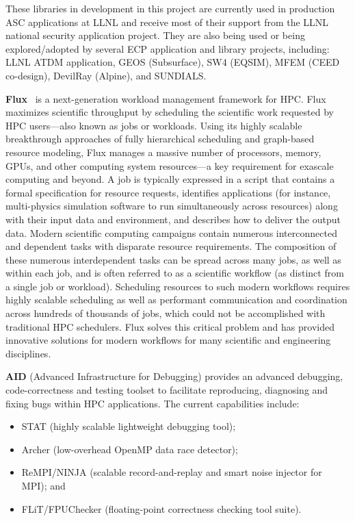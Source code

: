 These libraries in development in this project are currently used in
production ASC applications at
LLNL and receive most of their support from the LLNL national security
application project. They are also being used or being explored/adopted
by several ECP application and library projects, including: LLNL ATDM
application, GEOS (Subsurface), SW4 (EQSIM), MFEM (CEED co-design),
DevilRay (Alpine), and SUNDIALS.

\textbf{Flux}~\cite{flux,flux-fgcs:2020} is a next-generation workload management
framework for HPC. Flux maximizes scientific throughput
by scheduling the scientific work requested by HPC users--–also
known as jobs or workloads.  Using its highly scalable
breakthrough approaches of fully hierarchical scheduling and
graph-based resource modeling, Flux manages a massive number
of processors, memory, GPUs, and other computing system
resources--–a key requirement for exascale computing and beyond.
A job is typically expressed in a script that contains
a formal specification for resource requests, identifies
applications (for instance, multi-physics simulation software
to run simultaneously across resources) along with their
input data and environment, and describes how to deliver
the output data. Modern scientific computing campaigns
contain numerous interconnected and dependent tasks with
disparate resource requirements.
The composition of these
numerous interdependent tasks can be spread across many jobs,
as well as within each job, and is often referred to as a scientific
workflow (as distinct from a single job or workload). Scheduling
resources to such modern workflows requires highly scalable
scheduling as well as performant communication and coordination
across hundreds of thousands of jobs, which could not be
accomplished with traditional HPC schedulers. Flux solves this
critical problem and has provided innovative solutions
for modern workflows for many scientific and engineering
disciplines.


\textbf{AID} (Advanced Infrastructure for Debugging) provides an advanced
debugging, code-correctness and testing toolset to facilitate
reproducing, diagnosing and fixing bugs within HPC applications. The
current capabilities include:

\begin{itemize}
\item STAT (highly scalable lightweight debugging tool);
\item Archer (low-overhead OpenMP data race detector);
\item ReMPI/NINJA (scalable record-and-replay and smart noise injector for MPI); and
\item FLiT/FPUChecker (floating-point correctness checking tool suite).
\end{itemize}


